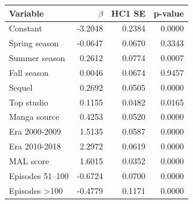 \begin{tabular}{lrrr}
\toprule
Variable & $\beta$ & HC1 SE & p-value
\\
\midrule
Constant & -3.2048 & 0.2384 & 0.0000
\\
Spring season & -0.0647 & 0.0670 & 0.3343
\\
Summer season & 0.2612 & 0.0774 & 0.0007
\\
Fall season & 0.0046 & 0.0674 & 0.9457
\\
Sequel & 0.2692 & 0.0505 & 0.0000
\\
Top studio & 0.1155 & 0.0482 & 0.0165
\\
Manga source & 0.4253 & 0.0520 & 0.0000
\\
Era 2000-2009 & 1.5135 & 0.0587 & 0.0000
\\
Era 2010-2018 & 2.2972 & 0.0619 & 0.0000
\\
MAL score & 1.6015 & 0.0352 & 0.0000
\\
Episodes 51--100 & -0.6724 & 0.0700 & 0.0000
\\
Episodes >100 & -0.4779 & 0.1171 & 0.0000
\\
\bottomrule
\end{tabular}
